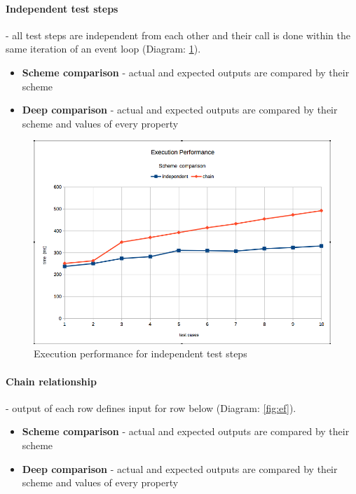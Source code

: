 \paragraph{Independent test steps} - all test steps are independent from each other and their call is done within the same iteration of an event loop (Diagram: \ref{fig:ei}).
\begin{itemize}
	\item \textbf{Scheme comparison} - actual and expected outputs are compared by their scheme
	\item \textbf{Deep comparison} - actual and expected outputs are compared by their scheme and values of every property
\end{itemize}
\begin{figure}[ht]
	\label{fig:ei}
	\centering
	\includegraphics[width=\textwidth]{grafiken/exec_scheme}
	\caption{Execution performance for independent test steps}
\end{figure}

\paragraph{Chain relationship} - output of each row defines input for row below (Diagram: \ref{fig:ef}).
\begin{itemize}
	\item \textbf{Scheme comparison} - actual and expected outputs are compared by their scheme
	\item \textbf{Deep comparison} - actual and expected outputs are compared by their scheme and values of every property
\end{itemize}

